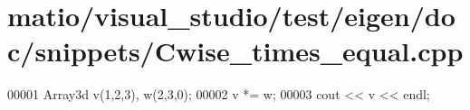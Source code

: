 \hypertarget{matio_2visual__studio_2test_2eigen_2doc_2snippets_2_cwise__times__equal_8cpp_source}{}\section{matio/visual\+\_\+studio/test/eigen/doc/snippets/\+Cwise\+\_\+times\+\_\+equal.cpp}
\label{matio_2visual__studio_2test_2eigen_2doc_2snippets_2_cwise__times__equal_8cpp_source}

\begin{DoxyCode}
00001 Array3d v(1,2,3), w(2,3,0);
00002 v *= w;
00003 cout << v << endl;
\end{DoxyCode}
